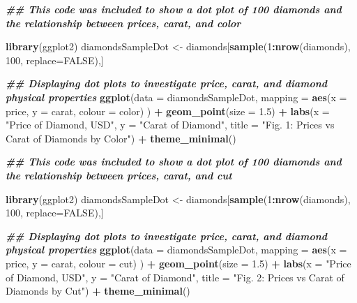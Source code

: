 \documentclass[
]{article}
\newenvironment{Shaded}{\begin{snugshade}}{\end{snugshade}}
\newcommand{\AttributeTok}[1]{\textcolor[rgb]{0.13,0.29,0.53}{#1}}
\newcommand{\ConstantTok}[1]{\textcolor[rgb]{0.56,0.35,0.01}{#1}}
\newcommand{\DecValTok}[1]{\textcolor[rgb]{0.00,0.00,0.81}{#1}}
\newcommand{\DocumentationTok}[1]{\textcolor[rgb]{0.56,0.35,0.01}{\textbf{\textit{#1}}}}
\newcommand{\FloatTok}[1]{\textcolor[rgb]{0.00,0.00,0.81}{#1}}
\newcommand{\FunctionTok}[1]{\textcolor[rgb]{0.13,0.29,0.53}{\textbf{#1}}}
\newcommand{\NormalTok}[1]{#1}
\newcommand{\OtherTok}[1]{\textcolor[rgb]{0.56,0.35,0.01}{#1}}
\newcommand{\SpecialCharTok}[1]{\textcolor[rgb]{0.81,0.36,0.00}{\textbf{#1}}}
\newcommand{\StringTok}[1]{\textcolor[rgb]{0.31,0.60,0.02}{#1}}
\begin{document}
\begin{Shaded}
\begin{Highlighting}[]
\DocumentationTok{\#\# This code was included to show a dot plot of 100 diamonds and the relationship between prices, carat, and color}

\FunctionTok{library}\NormalTok{(ggplot2)}
\NormalTok{diamondsSampleDot }\OtherTok{\textless{}{-}}\NormalTok{ diamonds[}\FunctionTok{sample}\NormalTok{(}\DecValTok{1}\SpecialCharTok{:}\FunctionTok{nrow}\NormalTok{(diamonds), }\DecValTok{100}\NormalTok{, }\AttributeTok{replace=}\ConstantTok{FALSE}\NormalTok{),]}

\DocumentationTok{\#\# Displaying dot plots to investigate price, carat, and diamond physical properties}
\FunctionTok{ggplot}\NormalTok{(}\AttributeTok{data =}\NormalTok{ diamondsSampleDot, }\AttributeTok{mapping =} \FunctionTok{aes}\NormalTok{(}\AttributeTok{x =}\NormalTok{ price, }\AttributeTok{y =}\NormalTok{ carat, }\AttributeTok{colour =}\NormalTok{ color) ) }\SpecialCharTok{+}
\FunctionTok{geom\_point}\NormalTok{(}\AttributeTok{size =} \FloatTok{1.5}\NormalTok{) }\SpecialCharTok{+} 
\FunctionTok{labs}\NormalTok{(}\AttributeTok{x =} \StringTok{"Price of Diamond, USD"}\NormalTok{, }\AttributeTok{y =} \StringTok{"Carat of Diamond"}\NormalTok{, }\AttributeTok{title =} \StringTok{"Fig. 1: Prices vs Carat of Diamonds by Color"}\NormalTok{) }\SpecialCharTok{+}
\FunctionTok{theme\_minimal}\NormalTok{()}
\end{Highlighting}
\end{Shaded}

\begin{Shaded}
\begin{Highlighting}[]
\DocumentationTok{\#\# This code was included to show a dot plot of 100 diamonds and the relationship between prices, carat, and cut}

\FunctionTok{library}\NormalTok{(ggplot2)}
\NormalTok{diamondsSampleDot }\OtherTok{\textless{}{-}}\NormalTok{ diamonds[}\FunctionTok{sample}\NormalTok{(}\DecValTok{1}\SpecialCharTok{:}\FunctionTok{nrow}\NormalTok{(diamonds), }\DecValTok{100}\NormalTok{, }\AttributeTok{replace=}\ConstantTok{FALSE}\NormalTok{),]}

\DocumentationTok{\#\# Displaying dot plots to investigate price, carat, and diamond physical properties}
\FunctionTok{ggplot}\NormalTok{(}\AttributeTok{data =}\NormalTok{ diamondsSampleDot, }\AttributeTok{mapping =} \FunctionTok{aes}\NormalTok{(}\AttributeTok{x =}\NormalTok{ price, }\AttributeTok{y =}\NormalTok{ carat, }\AttributeTok{colour =}\NormalTok{ cut) ) }\SpecialCharTok{+}
\FunctionTok{geom\_point}\NormalTok{(}\AttributeTok{size =} \FloatTok{1.5}\NormalTok{) }\SpecialCharTok{+} 
\FunctionTok{labs}\NormalTok{(}\AttributeTok{x =} \StringTok{"Price of Diamond, USD"}\NormalTok{, }\AttributeTok{y =} \StringTok{"Carat of Diamond"}\NormalTok{, }\AttributeTok{title =} \StringTok{"Fig. 2: Prices vs Carat of Diamonds by Cut"}\NormalTok{) }\SpecialCharTok{+}
\FunctionTok{theme\_minimal}\NormalTok{()}
\end{Highlighting}
\end{Shaded}
\end{document}
